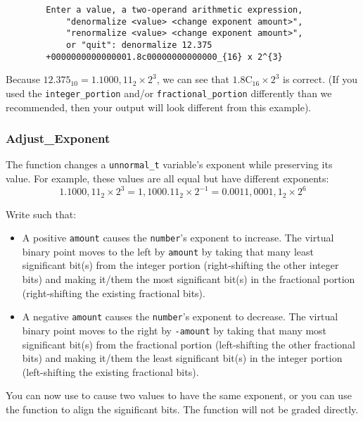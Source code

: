     \begin{verbatim}
        Enter a value, a two-operand arithmetic expression,
            "denormalize <value> <change exponent amount>",
            "renormalize <value> <change exponent amount>",
            or "quit": denormalize 12.375
        +0000000000000001.8c00000000000000_{16} x 2^{3}
    \end{verbatim}

    Because $12.375_{10} = 1.1000,11_{2} \times 2^3$, we can see that $1.8\mathrm{C}_{16} \times 2^3$ is correct.
    (If you used the \lstinline{integer_portion} and/or \lstinline{fractional_portion} differently than we recommended, then your output will look different from this example).

    \subsubsection{Adjust\_Exponent}

    The  function changes a \lstinline{unnormal_t} variable's exponent while preserving its value.
    For example, these values are all equal but have different exponents:
    \[
        1.1000,11_{2} \times 2^3 = 1,1000.11_{2} \times 2^{-1} = 0.0011,0001,1_{2} \times 2^6
    \]

    Write  such that:
    \begin{itemize}
        \item A positive \lstinline{amount} causes the \lstinline{number}'s exponent to increase.
            The virtual binary point moves to the left by \lstinline{amount} by taking that many least significant bit(s) from the integer portion (right-shifting the other integer bits) and making it/them the most significant bit(s) in the fractional portion (right-shifting the existing fractional bits).
        \item A negative \lstinline{amount} causes the \lstinline{number}'s exponent to decrease.
            The virtual binary point moves to the right by \lstinline{-amount} by taking that many most significant bit(s) from the fractional portion (left-shifting the other fractional bits) and making it/them the least significant bit(s) in the integer portion (left-shifting the existing fractional bits).
    \end{itemize}

    You can now use  to cause two values to have the same exponent, or you can use the function to align the significant bits.
    The  function will not be graded directly.

